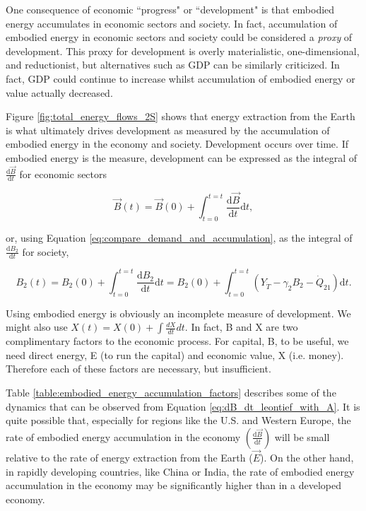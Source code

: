 One consequence of economic ``progress" or ``development" is that embodied energy accumulates in economic sectors and society. In fact, accumulation of embodied energy in economic sectors and society could be considered a \emph{proxy} of development. This proxy for development is overly materialistic, one-dimensional, and reductionist, but alternatives such as GDP can be similarly criticized. In fact, GDP could continue to increase whilst accumulation of embodied energy or value actually decreased.

Figure \ref{fig:total_energy_flows_2S} shows that energy extraction from the Earth is what ultimately drives development as measured by the accumulation of embodied energy in the economy and society. Development occurs over time. If embodied energy is the measure, development can be expressed as the integral of $\frac{\mathrm{d}\vec{B}}{\mathrm{d}t}$ for economic sectors

\begin{equation} \label{eq:Dev_Integral_Economy}
	\vec{B}(t) = \vec{B}(0) + \int_{t=0}^{t=t} \frac{\mathrm{d}\vec{B}}{\mathrm{d}t}\mathrm{d}t,
\end{equation}

\noindent or, using Equation \ref{eq:compare_demand_and_accumulation}, as the integral of $\frac{\mathrm{d}B_{2}}{\mathrm{d}t}$ for society,

\begin{equation} \label{eq:Dev_Integral_Society}
	B_{2}(t) = B_{2}(0) + \int_{t=0}^{t=t} \frac{\mathrm{d}B_{2}}{\mathrm{d}t}\mathrm{d}t = B_{2}(0) + \int_{t=0}^{t=t} (Y_{\dot{T}} - \gamma_{2}B_{2} - \dot{Q}_{21})\mathrm{d}t.
\end{equation}


Using embodied energy is obviously an incomplete measure of development. We might also use $X(t) = X(0) + \int\frac{dX}{dt}dt$. In fact, B and X are two complimentary factors to the economic process. For capital, B, to be useful, we need direct energy, E (to run the capital) and economic value, X (i.e. money). Therefore each of these factors are necessary, but insufficient.

Table \ref{table:embodied_energy_accumulation_factors} describes some of the dynamics that can be observed from Equation \ref{eq:dB_dt_leontief_with_A}. It is quite possible that, especially for regions like the U.S. and Western Europe, the rate of embodied energy accumulation in the economy $\left(\frac{\mathrm{d}\vec{B}}{\mathrm{d}t}\right)$ will be small relative to the rate of energy extraction from the Earth ($\vec{E}$). On the other hand, in rapidly developing countries, like China or India, the rate of embodied energy accumulation in the economy may be significantly higher than in a developed economy.



